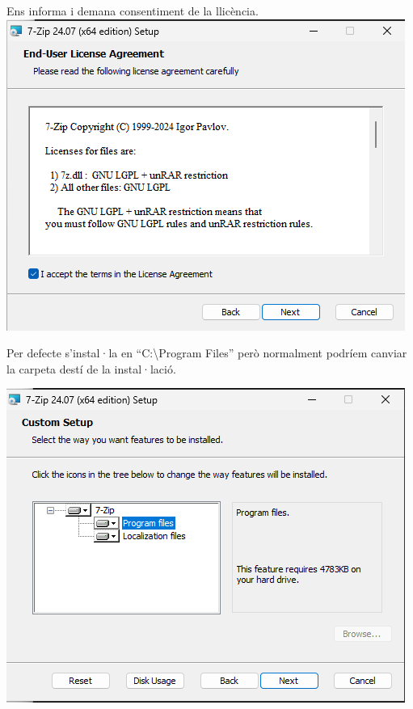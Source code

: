 \documentclass[
  a4paper,
]{article}
\begin{document}
Ens informa i demana consentiment de la llicència.
\includegraphics{png/instalarMSI2.png}

Per defecte s'instal·la en ``C:\textbackslash Program Files'' però
normalment podríem canviar la carpeta destí de la instal·lació.

\includegraphics{png/instalarMSI3.png}
\end{document}
